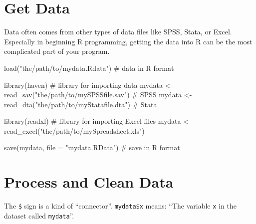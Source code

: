 \documentclass[
  letterpaper,
  DIV=11,
  numbers=noendperiod]{scrartcl}
\newenvironment{Shaded}{\begin{snugshade}}{\end{snugshade}}
\newcommand{\AttributeTok}[1]{\textcolor[rgb]{0.40,0.45,0.13}{#1}}
\newcommand{\CommentTok}[1]{\textcolor[rgb]{0.37,0.37,0.37}{#1}}
\newcommand{\ConstantTok}[1]{\textcolor[rgb]{0.56,0.35,0.01}{#1}}
\newcommand{\DecValTok}[1]{\textcolor[rgb]{0.68,0.00,0.00}{#1}}
\newcommand{\FunctionTok}[1]{\textcolor[rgb]{0.28,0.35,0.67}{#1}}
\newcommand{\NormalTok}[1]{\textcolor[rgb]{0.00,0.23,0.31}{#1}}
\newcommand{\OtherTok}[1]{\textcolor[rgb]{0.00,0.23,0.31}{#1}}
\newcommand{\SpecialCharTok}[1]{\textcolor[rgb]{0.37,0.37,0.37}{#1}}
\newcommand{\StringTok}[1]{\textcolor[rgb]{0.13,0.47,0.30}{#1}}
\begin{document}
\hypertarget{get-data}{%
\section{Get Data}\label{get-data}}

Data often comes from other types of data files like SPSS, Stata, or
Excel. Especially in beginning R programming, getting the data into R
can be the most complicated part of your program.

\begin{Shaded}
\begin{Highlighting}[]
\FunctionTok{load}\NormalTok{(}\StringTok{"the/path/to/mydata.Rdata"}\NormalTok{) }\CommentTok{\# data in R format}

\FunctionTok{library}\NormalTok{(haven) }\CommentTok{\# library for importing data }
\NormalTok{mydata }\OtherTok{\textless{}{-}} \FunctionTok{read\_sav}\NormalTok{(}\StringTok{"the/path/to/mySPSSfile.sav"}\NormalTok{) }\CommentTok{\# SPSS}
\NormalTok{mydata }\OtherTok{\textless{}{-}} \FunctionTok{read\_dta}\NormalTok{(}\StringTok{"the/path/to/myStatafile.dta"}\NormalTok{) }\CommentTok{\# Stata}

\FunctionTok{library}\NormalTok{(readxl) }\CommentTok{\# library for importing Excel files}
\NormalTok{mydata }\OtherTok{\textless{}{-}} \FunctionTok{read\_excel}\NormalTok{(}\StringTok{"the/path/to/mySpreadsheet.xls"}\NormalTok{)}

\FunctionTok{save}\NormalTok{(mydata, }\AttributeTok{file =} \StringTok{"mydata.RData"}\NormalTok{) }\CommentTok{\# save in R format}
\end{Highlighting}
\end{Shaded}

\hypertarget{process-and-clean-data}{%
\section{Process and Clean Data}\label{process-and-clean-data}}

The \texttt{\$} sign is a kind of ``connector''. \texttt{mydata\$x}
means: ``The variable \texttt{x} in the dataset called
\texttt{mydata}''.

\begin{Shaded}
\end{Shaded}
\end{document}
